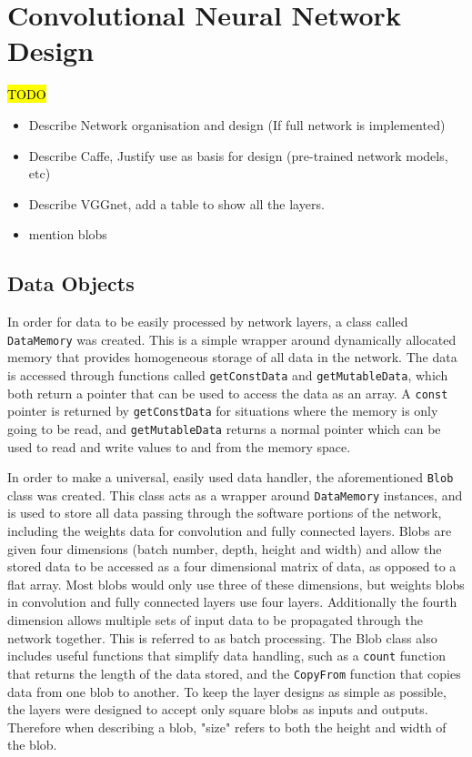 \documentclass[12pt]{article}
\begin{document}
\newpage

\section{Convolutional Neural Network Design}
\label{sec:Design-Network}

\hl{TODO}

\begin{itemize}
\item Describe Network organisation and design (If full network is implemented)
\item Describe Caffe, Justify use as basis for design (pre-trained network models, etc)
\item Describe VGGnet, add a table to show all the layers.
\item mention blobs
\end{itemize}

\subsection{Data Objects}
\label{sec:Design-Network-Blobs}

In order for data to be easily processed by network layers, a class called \lstinline|DataMemory| was created. This is a simple wrapper around dynamically allocated memory that provides homogeneous storage of all data in the network. The data is accessed through functions called \lstinline|getConstData| and \lstinline|getMutableData|, which both return a pointer that can be used to access the data as an array. A \lstinline|const| pointer is returned by \lstinline|getConstData| for situations where the memory is only going to be read, and \lstinline|getMutableData| returns a normal pointer which can be used to read and write values to and from the memory space.

In order to make a universal, easily used data handler, the aforementioned \lstinline|Blob| class was created. This class acts as a wrapper around \lstinline|DataMemory| instances, and is used to store all data passing through the software portions of the network, including the weights data for convolution and fully connected layers. Blobs are given four dimensions (batch number, depth, height and width) and allow the stored data to be accessed as a four dimensional matrix of data, as opposed to a flat array. Most blobs would only use three of these dimensions, but weights blobs in convolution and fully connected layers use four layers. Additionally the fourth dimension allows multiple sets of input data to be propagated through the network together. This is referred to as batch processing. The Blob class also includes useful functions that simplify data handling, such as a \lstinline|count| function that returns the length of the data stored, and the \lstinline|CopyFrom| function that copies data from one blob to another. To keep the layer designs as simple as possible, the layers were designed to accept only square blobs as inputs and outputs. Therefore when describing a blob, "size" refers to both the height and width of the blob.
\end{document}
